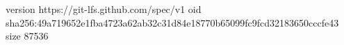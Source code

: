 version https://git-lfs.github.com/spec/v1
oid sha256:49a719652e1fba4723a62ab32c31d84e18770b65099fc9fcd32183650cccfe43
size 87536
